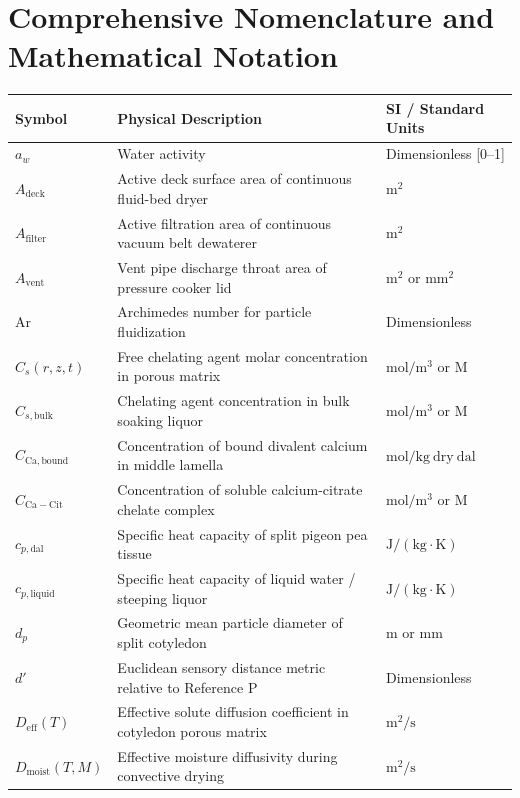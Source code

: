 \documentclass[10pt,a4paper]{article}
\begin{document}
\section*{Comprehensive Nomenclature and Mathematical Notation}

\begin{longtable}{p{2.5cm}p{10.2cm}p{3.0cm}}
\toprule
\textbf{Symbol} & \textbf{Physical Description} & \textbf{SI / Standard Units} \\
\midrule
\endhead
$a_w$ & Water activity & Dimensionless [0--1] \\
$A_{\mathrm{deck}}$ & Active deck surface area of continuous fluid-bed dryer & $\mathrm{m^2}$ \\
$A_{\mathrm{filter}}$ & Active filtration area of continuous vacuum belt dewaterer & $\mathrm{m^2}$ \\
$A_{\mathrm{vent}}$ & Vent pipe discharge throat area of pressure cooker lid & $\mathrm{m^2}$ or $\mathrm{mm^2}$ \\
$\mathrm{Ar}$ & Archimedes number for particle fluidization & Dimensionless \\
$C_s(r, z, t)$ & Free chelating agent molar concentration in porous matrix & $\mathrm{mol/m^3}$ or $\mathrm{M}$ \\
$C_{s,\mathrm{bulk}}$ & Chelating agent concentration in bulk soaking liquor & $\mathrm{mol/m^3}$ or $\mathrm{M}$ \\
$C_{\mathrm{Ca,bound}}$ & Concentration of bound divalent calcium in middle lamella & $\mathrm{mol/kg\ dry\ dal}$ \\
$C_{\mathrm{Ca-Cit}}$ & Concentration of soluble calcium-citrate chelate complex & $\mathrm{mol/m^3}$ or $\mathrm{M}$ \\
$c_{p,\mathrm{dal}}$ & Specific heat capacity of split pigeon pea tissue & $\mathrm{J/(kg \cdot K)}$ \\
$c_{p,\mathrm{liquid}}$ & Specific heat capacity of liquid water / steeping liquor & $\mathrm{J/(kg \cdot K)}$ \\
$d_p$ & Geometric mean particle diameter of split cotyledon & $\mathrm{m}$ or $\mathrm{mm}$ \\
$d'$ & Euclidean sensory distance metric relative to Reference P & Dimensionless \\
$D_{\mathrm{eff}}(T)$ & Effective solute diffusion coefficient in cotyledon porous matrix & $\mathrm{m^2/s}$ \\
$D_{\mathrm{moist}}(T, M)$ & Effective moisture diffusivity during convective drying & $\mathrm{m^2/s}$ \\

\end{longtable}
\end{document}
